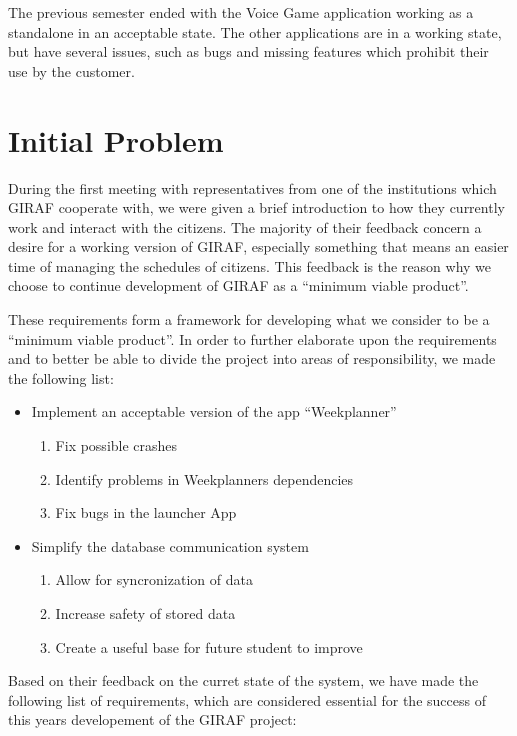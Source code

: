 The previous semester ended with the Voice Game application working as a
standalone in an acceptable state. The other applications are in a working
state, but have several issues, such as bugs and missing features which
prohibit their use by the customer.
  
\section{Initial Problem}
During the first meeting with representatives from one of the institutions which
GIRAF cooperate with, we were given a brief introduction to how they currently
work and interact with the citizens. The majority of their feedback concern a
desire for a working version of GIRAF, especially something that means an easier
time of managing the schedules of citizens. This feedback is the reason why we
choose to continue development of GIRAF as a ``minimum viable product''. 



These requirements form a framework for developing what we consider to be a
``minimum viable product''. In order to further elaborate upon the requirements
and to better be able to divide the project into areas of responsibility, we
made the following list:

\begin{itemize}
  \item Implement an acceptable version of the app ``Weekplanner''
  	\begin{enumerate}
  		\item Fix possible crashes
  		\item Identify problems in Weekplanners dependencies
  		\item Fix bugs in the launcher App
	\end{enumerate}
  \item Simplify the database communication system
   	\begin{enumerate}
  		\item Allow for syncronization of data
  		\item Increase safety of stored data
  		\item Create a useful base for future student to improve
	\end{enumerate}
\end{itemize}

 Based on their feedback on the curret state
of the system, we have made the following list of requirements, which are
considered essential for the success of this years developement of the GIRAF
project:

